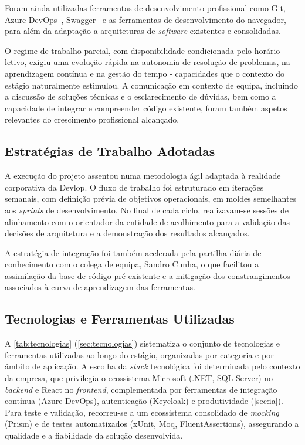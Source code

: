 Foram ainda utilizadas ferramentas de desenvolvimento profissional como Git, Azure DevOps~\cite{azuredevops}, Swagger~\cite{swagger} e as ferramentas de desenvolvimento do navegador, para além da adaptação a arquiteturas de \textit{software} existentes e consolidadas.

O regime de trabalho parcial, com disponibilidade condicionada pelo horário letivo, exigiu uma evolução rápida na autonomia de resolução de problemas, na aprendizagem contínua e na gestão do tempo - capacidades que o contexto do estágio naturalmente estimulou. A comunicação em contexto de equipa, incluindo a discussão de soluções técnicas e o esclarecimento de dúvidas, bem como a capacidade de integrar e compreender código existente, foram também aspetos relevantes do crescimento profissional alcançado.

\subsection{Estratégias de Trabalho Adotadas}

A execução do projeto assentou numa metodologia ágil adaptada à realidade corporativa da Devlop. O fluxo de trabalho foi estruturado em iterações semanais, com definição prévia de objetivos operacionais, em moldes semelhantes aos \textit{sprints} de desenvolvimento. No final de cada ciclo, realizavam-se sessões de alinhamento com o orientador da entidade de acolhimento para a validação das decisões de arquitetura e a demonstração dos resultados alcançados.

A estratégia de integração foi também acelerada pela partilha diária de conhecimento com o colega de equipa, Sandro Cunha, o que facilitou a assimilação da base de código pré-existente e a mitigação dos constrangimentos associados à curva de aprendizagem das ferramentas.

\subsection{Tecnologias e Ferramentas Utilizadas}

A \autoref{tab:tecnologias} (\autoref{sec:tecnologias}) sistematiza o conjunto de tecnologias e ferramentas utilizadas ao longo do estágio, organizadas por categoria e por âmbito de aplicação. A escolha da \textit{stack} tecnológica foi determinada pelo contexto da empresa, que privilegia o ecossistema Microsoft (.NET, SQL Server) no \textit{backend} e React no \textit{frontend}, complementada por ferramentas de integração contínua (Azure DevOps), autenticação (Keycloak) e produtividade (\autoref{sec:ia}). Para teste e validação, recorreu-se a um ecossistema consolidado de \textit{mocking} (Prism) e de testes automatizados (xUnit, Moq, FluentAssertions), assegurando a qualidade e a fiabilidade da solução desenvolvida.

